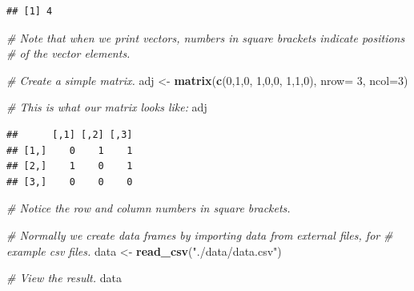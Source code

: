 \documentclass[
]{book}
\newenvironment{Shaded}{\begin{snugshade}}{\end{snugshade}}
\newcommand{\AttributeTok}[1]{\textcolor[rgb]{0.13,0.29,0.53}{#1}}
\newcommand{\CommentTok}[1]{\textcolor[rgb]{0.56,0.35,0.01}{\textit{#1}}}
\newcommand{\DecValTok}[1]{\textcolor[rgb]{0.00,0.00,0.81}{#1}}
\newcommand{\FunctionTok}[1]{\textcolor[rgb]{0.13,0.29,0.53}{\textbf{#1}}}
\newcommand{\NormalTok}[1]{#1}
\newcommand{\OtherTok}[1]{\textcolor[rgb]{0.56,0.35,0.01}{#1}}
\newcommand{\StringTok}[1]{\textcolor[rgb]{0.31,0.60,0.02}{#1}}
\begin{document}
\begin{verbatim}
## [1] 4
\end{verbatim}

\begin{Shaded}
\begin{Highlighting}[]
\CommentTok{\# Note that when we print vectors, numbers in square brackets indicate positions}
\CommentTok{\# of the vector elements.}

\CommentTok{\# Create a simple matrix.}
\NormalTok{adj }\OtherTok{\textless{}{-}} \FunctionTok{matrix}\NormalTok{(}\FunctionTok{c}\NormalTok{(}\DecValTok{0}\NormalTok{,}\DecValTok{1}\NormalTok{,}\DecValTok{0}\NormalTok{, }\DecValTok{1}\NormalTok{,}\DecValTok{0}\NormalTok{,}\DecValTok{0}\NormalTok{, }\DecValTok{1}\NormalTok{,}\DecValTok{1}\NormalTok{,}\DecValTok{0}\NormalTok{), }\AttributeTok{nrow=} \DecValTok{3}\NormalTok{, }\AttributeTok{ncol=}\DecValTok{3}\NormalTok{)}

\CommentTok{\# This is what our matrix looks like:}
\NormalTok{adj}
\end{Highlighting}
\end{Shaded}

\begin{verbatim}
##      [,1] [,2] [,3]
## [1,]    0    1    1
## [2,]    1    0    1
## [3,]    0    0    0
\end{verbatim}

\begin{Shaded}
\begin{Highlighting}[]
\CommentTok{\# Notice the row and column numbers in square brackets. }

\CommentTok{\# Normally we create data frames by importing data from external files, for}
\CommentTok{\# example csv files.}
\NormalTok{data }\OtherTok{\textless{}{-}} \FunctionTok{read\_csv}\NormalTok{(}\StringTok{"./data/data.csv"}\NormalTok{)}

\CommentTok{\# View the result.}
\NormalTok{data}
\end{Highlighting}
\end{Shaded}
\end{document}
